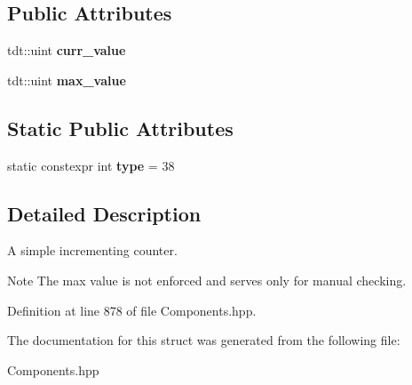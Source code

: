 \subsection*{Public Attributes}
\begin{DoxyCompactItemize}
\item 
tdt\+::uint {\bfseries curr\+\_\+value}\hypertarget{struct_counter_component_a7fbe0d431478bd7cd3057df6a157e78f}{}\label{struct_counter_component_a7fbe0d431478bd7cd3057df6a157e78f}

\item 
tdt\+::uint {\bfseries max\+\_\+value}\hypertarget{struct_counter_component_a1203c92025bb02cd46d442d8d6bafd63}{}\label{struct_counter_component_a1203c92025bb02cd46d442d8d6bafd63}

\end{DoxyCompactItemize}
\subsection*{Static Public Attributes}
\begin{DoxyCompactItemize}
\item 
static constexpr int {\bfseries type} = 38\hypertarget{struct_counter_component_a21cdfada7885913d432ae7a66320e56f}{}\label{struct_counter_component_a21cdfada7885913d432ae7a66320e56f}

\end{DoxyCompactItemize}


\subsection{Detailed Description}
A simple incrementing counter. 

\begin{DoxyNote}{Note}
The max value is not enforced and serves only for manual checking. 
\end{DoxyNote}


Definition at line 878 of file Components.\+hpp.



The documentation for this struct was generated from the following file\+:\begin{DoxyCompactItemize}
\item 
Components.\+hpp\end{DoxyCompactItemize}
